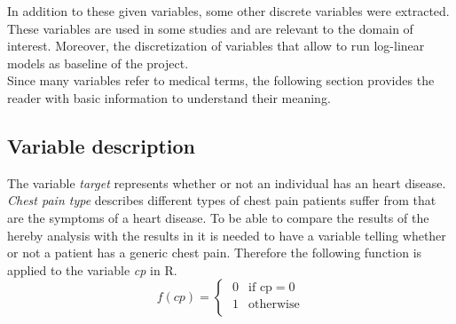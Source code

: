 \documentclass{article}
\begin{document}
In addition to these given variables, some other discrete variables were extracted. These variables are used in some studies and are relevant to the domain of interest. Moreover, the discretization of variables that allow to run log-linear models as baseline of the project. \\

Since many variables refer to medical terms, the following section provides the reader with basic information to understand their meaning.

\subsection{Variable description}

The variable \textit{target} represents whether or not an individual has an heart disease. \\

\textit{Chest pain type} describes different types of chest pain patients suffer from that are the symptoms of a heart disease. To be able to compare the results of the hereby analysis with the results in \cite{Steno} it is needed to have a variable telling whether or not a patient has a generic chest pain. Therefore the following function is applied to the variable \textit{cp} in R.
\begin{equation}
    f(cp) = \begin{cases}
                \;0 & \text{if cp} = 0 \\
                \; 1 & \text{otherwise} \\
                \end{cases}
\end{equation} \\
\end{document}

